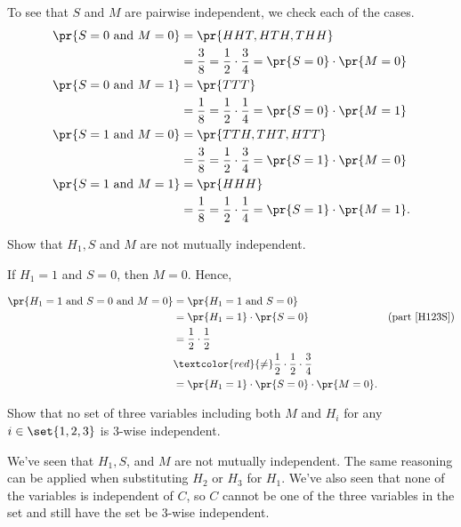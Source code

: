 \documentclass[handout]{mcs}
\begin{document}
\begin{problem}
\begin{solution}
To see that $S$ and $M$ are pairwise independent, we check each of the cases.
\begin{align*}
\pr{S=0 \text{ and } M=0} & = \pr{HHT,HTH,THH}\\
    & = \frac{3}{8} = \frac{1}{2} \cdot \frac{3}{4} =\pr{S=0} \cdot \pr{M = 0}\\
\pr{S=0 \text{ and } M=1} & = \pr{TTT}\\
    & = \frac{1}{8} = \frac{1}{2} \cdot \frac{1}{4} =\pr{S=0} \cdot \pr{M = 1}\\
\pr{S=1 \text{ and } M=0} & = \pr{TTH,THT,HTT}\\
    & = \frac{3}{8} = \frac{1}{2} \cdot \frac{3}{4} =\pr{S = 1} \cdot \pr{M = 0}\\
\pr{S=1 \text{ and } M=1} & = \pr{HHH}\\
    & = \frac{1}{8} = \frac{1}{2} \cdot \frac{1}{4} =\pr{S = 1} \cdot \pr{M = 1}.
\end{align*}

\end{solution}

\ppart Show that $H_1,S$ and $M$  are not mutually independent.

\begin{solution}
If $H_1=1$ and $S=0$, then $M=0$.  Hence,

\begin{align*}
\pr{H_1=1 \text{ and } S=0 \text{ and } M=0} & = \pr{H_1=1 \text{ and } S=0}\\
    & = \pr{H_1=1}\cdot \pr{S=0}  & \text{(part~\eqref{H123S})}\\
    & = \frac{1}{2} \cdot  \frac{1}{2}\\
    & \textcolor{red}{\neq} \frac{1}{2} \cdot  \frac{1}{2} \cdot \frac{3}{4}\\
    & = \pr{H_1=1}\cdot \pr{S=0} \cdot \pr{M=0}.
\end{align*}
\end{solution}

\ppart Show that no set of three variables including both $M$ and $H_i$
for any $i\in \set{1,2,3}$ is 3-wise independent.

\begin{solution}

We've seen that $H_1,S$, and $M$ are not mutually independent.
  The same reasoning can be applied when substituting $H_2$ or $H_3$ for
  $H_1$.  We've also seen that none of the variables is independent of
  $C$, so $C$ cannot be one of the three variables in the set and still
  have the set be 3-wise independent.


\end{solution}
\end{problem}
\end{document}

